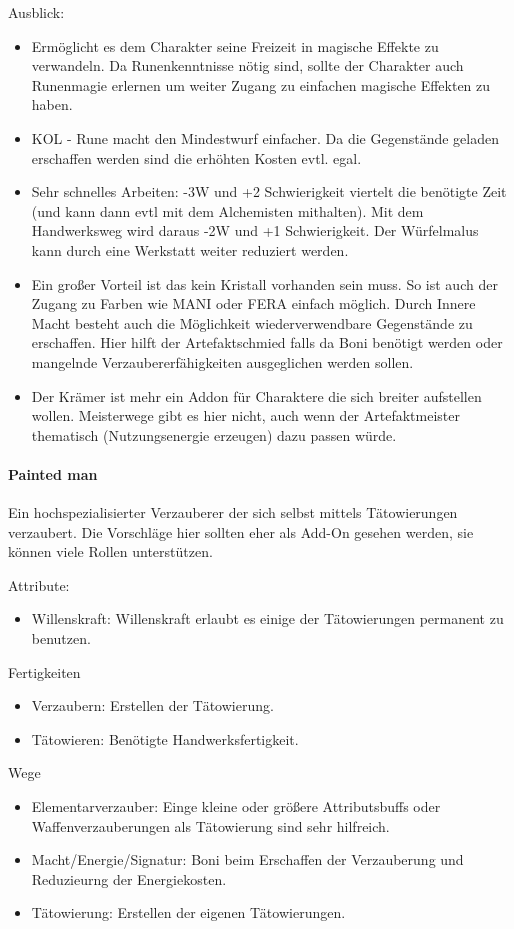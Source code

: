 \documentclass{article}
\begin{document}
Ausblick:
\begin{itemize}
\item Ermöglicht es dem Charakter seine Freizeit in magische Effekte zu verwandeln. Da Runenkenntnisse nötig sind, sollte der Charakter auch Runenmagie erlernen um weiter Zugang zu einfachen magische Effekten zu haben.
\item KOL - Rune macht den Mindestwurf einfacher. Da die Gegenstände geladen erschaffen werden sind die erhöhten Kosten evtl. egal.
\item Sehr schnelles Arbeiten: -3W und +2 Schwierigkeit viertelt die benötigte Zeit (und kann dann evtl mit dem Alchemisten mithalten). Mit dem Handwerksweg wird daraus -2W und +1 Schwierigkeit. Der Würfelmalus kann durch eine Werkstatt weiter reduziert werden.
\item Ein großer Vorteil ist das kein Kristall vorhanden sein muss. So ist auch der Zugang zu Farben wie MANI oder FERA einfach möglich. Durch Innere Macht besteht auch die Möglichkeit wiederverwendbare Gegenstände zu erschaffen. Hier hilft der Artefaktschmied falls da Boni benötigt werden oder mangelnde Verzaubererfähigkeiten ausgeglichen werden sollen.
\item Der Krämer ist mehr ein Addon für Charaktere die sich breiter aufstellen wollen. Meisterwege gibt es hier nicht, auch wenn der Artefaktmeister thematisch (Nutzungsenergie erzeugen) dazu passen würde.
\end{itemize}

\paragraph{Painted man}
Ein hochspezialisierter Verzauberer der sich selbst mittels Tätowierungen verzaubert. Die Vorschläge hier sollten
eher als Add-On gesehen werden, sie können viele Rollen unterstützen.

Attribute:
\begin{itemize}
\item Willenskraft: Willenskraft erlaubt es einige der Tätowierungen permanent zu benutzen.
\end{itemize}

Fertigkeiten
\begin{itemize}
\item Verzaubern: Erstellen der Tätowierung.
\item Tätowieren: Benötigte Handwerksfertigkeit.
\end{itemize}

Wege
\begin{itemize}
\item Elementarverzauber: Einge kleine oder größere Attributsbuffs oder Waffenverzauberungen als Tätowierung sind sehr hilfreich.
\item Macht/Energie/Signatur: Boni beim Erschaffen der Verzauberung und Reduzieurng der Energiekosten.
\item Tätowierung: Erstellen der eigenen Tätowierungen.
\end{itemize}
\end{document}
